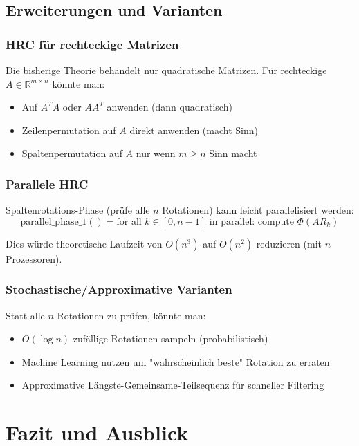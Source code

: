 \documentclass[a4paper,12pt]{article}
\theoremstyle{definition}
\begin{document}
\subsection{Erweiterungen und Varianten}

\subsubsection{HRC für rechteckige Matrizen}

Die bisherige Theorie behandelt nur quadratische Matrizen. Für rechteckige $A \in \mathbb{R}^{m \times n}$ könnte man:

\begin{itemize}
	\item Auf $A^T A$ oder $A A^T$ anwenden (dann quadratisch)
	\item Zeilenpermutation auf $A$ direkt anwenden (macht Sinn)
	\item Spaltenpermutation auf $A$ nur wenn $m \geq n$ Sinn macht
\end{itemize}

\subsubsection{Parallele HRC}

Spaltenrotations-Phase (prüfe alle $n$ Rotationen) kann leicht parallelisiert werden:
\[
\text{parallel\_phase\_1}() = \text{for all } k \in [0, n-1] \text{ in parallel: compute } \Phi(AR_k)
\]

Dies würde theoretische Laufzeit von $O(n^3)$ auf $O(n^2)$ reduzieren (mit $n$ Prozessoren).

\subsubsection{Stochastische/Approximative Varianten}

Statt alle $n$ Rotationen zu prüfen, könnte man:
\begin{itemize}
	\item $O(\log n)$ zufällige Rotationen sampeln (probabilistisch)
	\item Machine Learning nutzen um "wahrscheinlich beste" Rotation zu erraten
	\item Approximative Längste-Gemeinsame-Teilsequenz für schneller Filtering
\end{itemize}

\section{Fazit und Ausblick}
\end{document}
